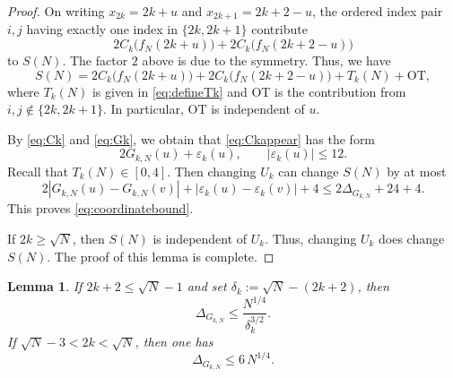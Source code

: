 \documentclass[12pt,reqno]{amsart}
\theoremstyle{plain}
\newtheorem{lemma}{Lemma}[section]
\theoremstyle{definition}
\begin{document}
\begin{proof}On writing $x_{2k}=2k+u$ and $x_{2k+1}=2k+2-u$, the ordered index pair $i,j$ having exactly one
index in $\{2k,2k+1\}$ contribute
\begin{equation}\label{eq:Ckappear}
 2C_k\bigl(f_N(2k+u)\bigr)
 +2C_k\bigl(f_N(2k+2-u)\bigr)
\end{equation}
to $S(N)$. The factor $2$ above is due to the symmetry. Thus, we have
$$S(N)=2C_k\bigl(f_N(2k+u)\bigr)
 +2C_k\bigl(f_N(2k+2-u)\bigr)+T_{k}(N)+\textrm{OT},$$
 where $T_k(N)$ is given in \eqref{eq:defineTk} and  OT is the contribution from $i,j\not\in \{2k,2k+1\}$. In particular, OT is independent of $u$.


By \eqref{eq:Ck} and \eqref{eq:Gk}, we obtain that \eqref{eq:Ckappear} has the form
\begin{equation*}
 2G_{k,N}(u)+\varepsilon_k(u),\qquad
 |\varepsilon_k(u)|\le12.
\end{equation*}
Recall that $T_k(N)\in[0,4]$. Then changing $U_k$ can change
$S(N)$ by at most
\[
 2|G_{k,N}(u)-G_{k,N}(v)|
 +|\varepsilon_k(u)-\varepsilon_k(v)|+4
 \le2\Delta_{G_{k,N}}+24+4.
\]
This proves \eqref{eq:coordinatebound}.

If $2k\ge \sqrt{N}$, then $S(N)$ is independent of $U_k$. Thus, changing $U_k$ does change
$S(N)$. The proof of this lemma is complete.
\end{proof}

\begin{lemma}\label{lem:oscillation}
If $2k+2\le \sqrt{N}-1$ and set
$\delta_k:=\sqrt{N}-(2k+2)$, then
\begin{equation}\label{eq:interior}
 \Delta_{G_{k,N}}\le \frac{N^{1/4}}{\delta_k^{3/2}}.
\end{equation}
If $\sqrt{N}-3<2k<\sqrt{N}$, then one has
\begin{equation}\label{eq:endpoint}
 \Delta_{G_{k,N}}\le6\,N^{1/4}.
\end{equation}
\end{lemma}
\end{document}
